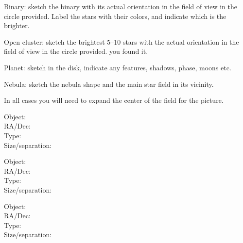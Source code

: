 \medskip\noindent 
Binary: sketch the binary with its actual
orientation in the field of view in the circle provided.
Label the stars with their colors, and indicate which
is the brighter.  

\medskip\noindent 
Open cluster: sketch the brightest 5--10 stars with the actual
orientation in the field of view in the circle provided.
you found it.  

\medskip\noindent 
Planet:  sketch in the disk, indicate any features, shadows, phase, moons etc.

\medskip\noindent
Nebula: sketch the nebula shape and the main star field in its vicinity.

\medskip\noindent 
In all cases you will need to expand the center of the field for the picture.

\newpage

\parbox[b]{8cm}{ Object: \makebox[3cm]{\hrulefill}\\
RA/Dec: \makebox[3cm]{\hrulefill} \\
Type: \makebox[3cm]{\hrulefill} \\
Size/separation:  \makebox[1.5cm]{\hrulefill} \\ }   \begin{minipage}[b]{8cm}{}\end{minipage}

\bigskip\noindent 

\parbox[b]{8cm}{ Object: \makebox[3cm]{\hrulefill}\\
RA/Dec: \makebox[3cm]{\hrulefill} \\
Type: \makebox[3cm]{\hrulefill} \\
Size/separation:  \makebox[1.5cm]{\hrulefill} \\ }   \begin{minipage}[b]{8cm}{}\end{minipage}

\bigskip\noindent 

\parbox[b]{8cm}{ Object: \makebox[3cm]{\hrulefill}\\
RA/Dec: \makebox[3cm]{\hrulefill} \\
Type: \makebox[3cm]{\hrulefill} \\
Size/separation:  \makebox[1.5cm]{\hrulefill} \\ }   \begin{minipage}[b]{8cm}{}\end{minipage}

